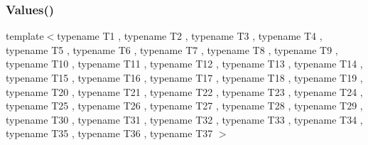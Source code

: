 \subsubsection{\texorpdfstring{Values()}{Values()}\hspace{0.1cm}{\footnotesize\ttfamily [38/51]}}
{\footnotesize\ttfamily template$<$typename T1 , typename T2 , typename T3 , typename T4 , typename T5 , typename T6 , typename T7 , typename T8 , typename T9 , typename T10 , typename T11 , typename T12 , typename T13 , typename T14 , typename T15 , typename T16 , typename T17 , typename T18 , typename T19 , typename T20 , typename T21 , typename T22 , typename T23 , typename T24 , typename T25 , typename T26 , typename T27 , typename T28 , typename T29 , typename T30 , typename T31 , typename T32 , typename T33 , typename T34 , typename T35 , typename T36 , typename T37 $>$ \\
}

